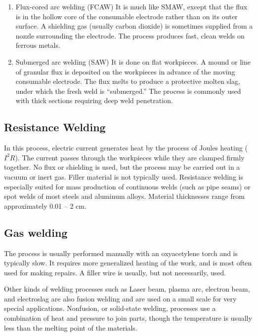 \documentclass[a4paper,openany,12pt]{book}
\begin{document}
{{\begin{enumerate}
3.0 Unported
\url{pictures/Welding/gas-tungsten-arc-welding}

\item Flux-cored arc welding (FCAW)
\label{flux-cored-arc-welding-fcaw}
It is much like SMAW, except that the flux is in the hollow core of the
consumable electrode rather than on its outer surface. A shielding gas
(usually carbon dioxide) is sometimes supplied from a nozzle surrounding
the electrode. The process produces fast, clean welds on ferrous metals.

\item Submerged arc welding (SAW)
\label{submerged-arc-welding-saw}
It is done on flat workpieces. A mound or line of granular flux is
deposited on the workpieces in advance of the moving consumable
electrode. The flux melts to produce a protective molten slag, under
which the fresh weld is ``submerged.'' The process is commonly used with
thick sections requiring deep weld penetration.
\end{enumerate}

\subsection{Resistance Welding}
\label{resistance-welding}
In this process, electric current generates heat by the process of
Joules heating (\(I^2R\)). The current passes through the workpieces while
they are clamped firmly together. No flux or shielding is used, but the
process may be carried out in a vacuum or inert gas. Filler material is
not typically used. Resistance welding is especially suited for mass
production of continuous welds (such as pipe seams) or spot welds of
most steels and aluminum alloys. Material thicknesses range from
approximately 0.01 -- 2 cm.

\subsection{Gas welding}
\label{gas-welding}
The process is usually performed manually with an oxyacetylene torch and
is typically slow. It requires more generalized heating of the work, and
is most often used for making repairs. A filler wire is usually, but not
necessarily, used.

Other kinds of welding processes such as Laser beam, plasma arc,
electron beam, and electroslag are also fusion welding and are used on a
small scale for very special applications. Nonfusion, or solid-state
welding, processes use a combination of heat and pressure to join parts,
though the temperature is usually less than the melting point of the
materials.

}}
\end{document}
